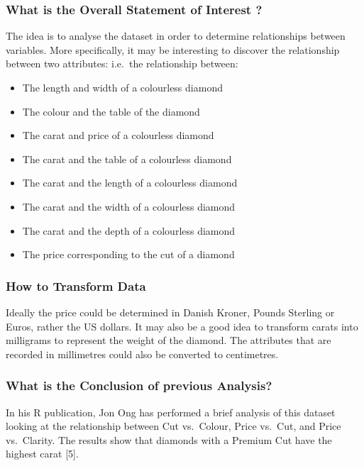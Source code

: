 \documentclass[
]{article}
\providecommand{\tightlist}{%
  \setlength{\itemsep}{0pt}\setlength{\parskip}{0pt}}
\begin{document}
\subsubsection{What is the Overall Statement of Interest
?}\label{what-is-the-overall-statement-of-interest}

The idea is to analyse the dataset in order to determine relationships
between variables. More specifically, it may be interesting to discover
the relationship between two attributes: i.e.~the relationship between:

\begin{itemize}
\tightlist
\item
  The length and width of a colourless diamond
\item
  The colour and the table of the diamond
\item
  The carat and price of a colourless diamond
\item
  The carat and the table of a colourless diamond
\item
  The carat and the length of a colourless diamond
\item
  The carat and the width of a colourless diamond
\item
  The carat and the depth of a colourless diamond
\item
  The price corresponding to the cut of a diamond
\end{itemize}

\subsubsection{How to Transform Data}\label{how-to-transform-data}

Ideally the price could be determined in Danish Kroner, Pounds Sterling
or Euros, rather the US dollars. It may also be a good idea to transform
carats into milligrams to represent the weight of the diamond. The
attributes that are recorded in millimetres could also be converted to
centimetres.

\subsubsection{What is the Conclusion of previous
Analysis?}\label{what-is-the-conclusion-of-previous-analysis}

In his R publication, Jon Ong has performed a brief analysis of this
dataset looking at the relationship between Cut vs.~Colour, Price
vs.~Cut, and Price vs.~Clarity. The results show that diamonds with a
Premium Cut have the highest carat {[}5{]}.
\end{document}
